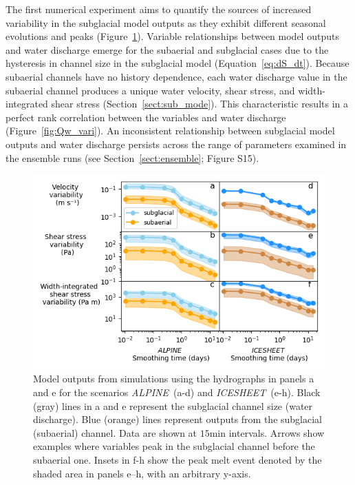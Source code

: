 \documentclass[tc, manuscript]{copernicus}
\newcommand{\alpine}{\textit{ALPINE}\,}
\newcommand{\icesheet}{\textit{ICESHEET}\,}
\begin{document}
The first numerical experiment aims to quantify the sources of increased variability in the subglacial model outputs as they exhibit different seasonal evolutions and peaks (Figure~\ref{fig:model_outs}).
Variable relationships between model outputs and water discharge emerge for the subaerial and subglacial cases due to the hysteresis in channel size in the subglacial model (Equation~\ref{eq:dS_dt}).
Because subaerial channels have no history dependence, each water discharge value in the subaerial channel produces a unique water velocity, shear stress, and width-integrated shear stress (Section~\ref{sect:sub_mode}).
This characteristic results in a perfect rank correlation between the variables and water discharge (Figure~\ref{fig:Qw_vari}).
An inconsistent relationship between subglacial model outputs and water discharge persists across the range of parameters examined in the ensemble runs (see Section~\ref{sect:ensemble}; Figure S15).
\begin{figure}[hbt!]
  \centering
  \includegraphics[width=\linewidth]{Fig5.png}
  \caption{Model outputs from simulations using the hydrographs in panels a and e for the scenarios \alpine{} (a-d) and \icesheet{} (e-h).
    Black (gray) lines in a and e represent the subglacial channel size (water discharge).
    Blue (orange) lines represent outputs from the subglacial (subaerial) channel.
    Data are shown at $15$\unit{min} intervals.
    Arrows show examples where variables peak in the subglacial channel before the subaerial one.
    Insets in f-h show the peak melt event denoted by the shaded area in panels e--h, with an arbitrary y-axis.
  }
  \label{fig:model_outs}
\end{figure}
\end{document}
